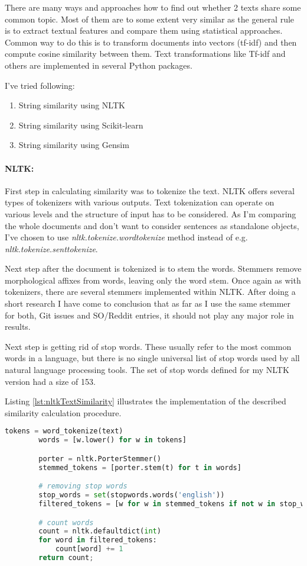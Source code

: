 There are many ways and approaches how to find out whether 2 texts share some common topic. Most of them are to some extent very similar as the general rule is to extract textual features and compare them using statistical approaches. Common way to do this is to transform documents into vectors (tf-idf) and then compute cosine similarity between them. Text transformations like Tf-idf and others are implemented in several Python packages.

I've tried following:
\begin{enumerate}
\item String similarity using NLTK
\item String similarity using Scikit-learn
\item String similarity using Gensim
\end{enumerate}

\paragraph{NLTK:}First step in calculating similarity was to tokenize the text. NLTK offers several types of tokenizers with various outputs. Text tokenization can operate on various levels and the structure of input has to be considered. As I'm comparing the whole documents and don't want to consider sentences as standalone objects, I've chosen to use \textit{nltk.tokenize.wordtokenize} method instead of e.g. \textit{nltk.tokenize.senttokenize}.

Next step after the document is tokenized is to stem the words. Stemmers remove morphological affixes from words, leaving only the word stem. Once again as with tokenizers, there are several stemmers implemented within NLTK. After doing a short research I have come to conclusion that as far as I use the same stemmer for both, Git issues and SO/Reddit entries, it should not play any major role in results.

Next step is getting rid of stop words. These usually refer to the most common words in a language, but there is no single universal list of stop words used by all natural language processing tools. The set of stop words defined for my NLTK version had a size of 153.

Listing \ref{lst:nltkTextSimilarity} illustrates the implementation of the described similarity calculation procedure.

\begin{lstlisting}[caption={Text similarity implementation with NLTK},label={lst:nltkTextSimilarity},language=Python]
		tokens = word_tokenize(text)
		words = [w.lower() for w in tokens]

		porter = nltk.PorterStemmer()
		stemmed_tokens = [porter.stem(t) for t in words]

		# removing stop words
		stop_words = set(stopwords.words('english'))
		filtered_tokens = [w for w in stemmed_tokens if not w in stop_words]

		# count words
		count = nltk.defaultdict(int)
		for word in filtered_tokens:
			count[word] += 1
		return count;
\end{lstlisting}

